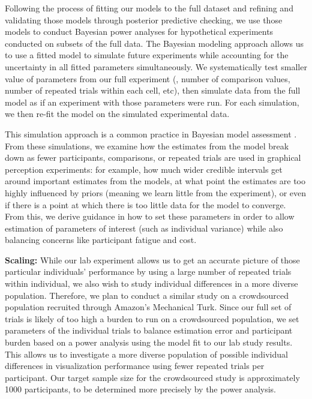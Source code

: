 \documentclass[11pt]{article}
\begin{document}
Following the process of fitting our models to the full dataset and refining and validating those models through posterior predictive checking, we use those models to conduct Bayesian power analyses \cite{kruschke2016bns} for hypothetical experiments conducted on subsets of the full data.
The Bayesian modeling approach allows us to use a fitted model to simulate future experiments while accounting for the uncertainty in all fitted parameters simultaneously.
We systematically test smaller value of parameters from our full experiment (\eg, number of comparison values, number of repeated trials within each cell, etc), then simulate data from the full model as if an experiment with those parameters were run. For each simulation, we then re-fit the model on the simulated experimental data.

This simulation approach is a common practice in Bayesian model assessment \cite{gabry2017visualization,kruschke2016bns}. 
From these simulations, we examine how the estimates from the model break down as fewer participants, comparisons, or repeated trials are used in graphical perception experiments: for example, how much wider credible intervals get around important estimates from the models, at what point the estimates are too highly influenced by priors (meaning we learn little from the experiment), or even if there is a point at which there is too little data for the model to converge.
From this, we derive guidance in how to set these parameters in order to allow estimation of parameters of interest (such as individual variance) while also balancing concerns like participant fatigue and cost.

\noindent\textbf{Scaling:} While our lab experiment allows us to get an accurate picture of those particular individuals' performance by using a large number of repeated trials within individual, we also wish to study individual differences in a more diverse population.
Therefore, we plan to conduct a similar study on a crowdsourced population recruited through Amazon's Mechanical Turk.
Since our full set of trials is likely of too high a burden to run on a crowdsourced population, we set parameters of the individual trials to balance estimation error and participant burden based on a power analysis using the model fit to our lab study results.
This allows us to investigate a more diverse population of possible individual differences in visualization performance using fewer repeated trials per participant.
Our target sample size for the crowdsourced study is approximately 1000 participants, to be determined more precisely by the power analysis.
\end{document}
